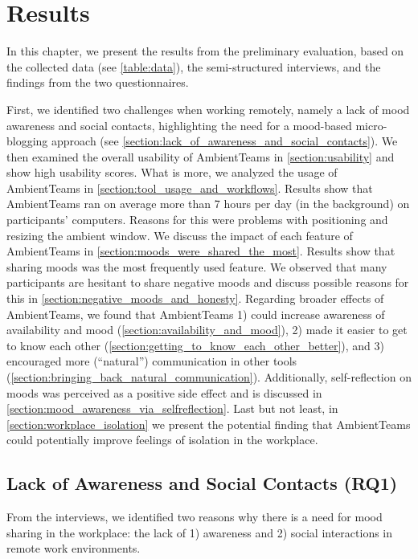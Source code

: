 \chapter{Results}
\label{chapter:results}
In this chapter, we present the results from the preliminary evaluation, based on the collected data (see \autoref{table:data}), the semi-structured interviews, and the findings from the two questionnaires. 

First, we identified two challenges when working remotely, namely a lack of mood awareness and social contacts, highlighting the need for a mood-based micro-blogging approach (see \autoref{section:lack_of_awareness_and_social_contacts}). We then examined the overall usability of AmbientTeams in \autoref{section:usability} and show high usability scores. What is more, we analyzed the usage of AmbientTeams in \autoref{section:tool_usage_and_workflows}. Results show that AmbientTeams ran on average more than 7 hours per day (in the background) on participants' computers. Reasons for this were problems with positioning and resizing the ambient window. We discuss the impact of each feature of AmbientTeams in \autoref{section:moods_were_shared_the_most}. Results show that sharing moods was the most frequently used feature. We observed that many participants are hesitant to share negative moods and discuss possible reasons for this in \autoref{section:negative_moods_and_honesty}. Regarding broader effects of AmbientTeams, we found that AmbientTeams 1) could increase awareness of availability and mood (\autoref{section:availability_and_mood}), 2) made it easier to get to know each other (\autoref{section:getting_to_know_each_other_better}), and 3) encouraged more (\enquote{natural}) communication in other tools (\autoref{section:bringing_back_natural_communication}). Additionally, self-reflection on moods was perceived as a positive side effect and is discussed in \autoref{section:mood_awareness_via_selfreflection}. Last but not least, in \autoref{section:workplace_isolation} we present the potential finding that AmbientTeams could potentially improve feelings of isolation in the workplace.

\section{Lack of Awareness and Social Contacts (RQ1)}
\label{section:lack_of_awareness_and_social_contacts}
From the interviews, we identified two reasons why there is a need for mood sharing in the workplace: the lack of 1) awareness and 2) social interactions in remote work environments.

